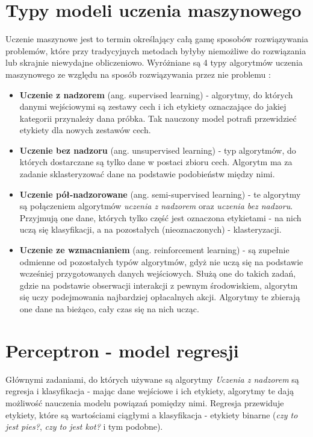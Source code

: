 \documentclass[12pt]{aghdpl}
\begin{document}
		\section{Typy modeli uczenia maszynowego}
		Uczenie maszynowe jest to termin określający całą gamę sposobów rozwiązywania problemów, które przy tradycyjnych metodach byłyby niemożliwe do rozwiązania lub skrajnie niewydajne obliczeniowo. Wyróżniane są 4 typy algorytmów uczenia maszynowego ze względu na sposób rozwiązywania przez nie problemu 	\cite{types_of_machine_learning_algorithms}:
		\begin{itemize}
		\item \textbf{Uczenie z nadzorem} (ang. supervised learning) - algorytmy, do których danymi wejściowymi są zestawy cech i ich etykiety oznaczające do jakiej kategorii przynależy dana próbka. Tak nauczony model potrafi przewidzieć etykiety dla nowych zestawów cech.
		\item \textbf{Uczenie bez nadzoru} (ang. unsupervised learning) - typ algorytmów, do których dostarczane są tylko dane w postaci zbioru cech. Algorytm ma za zadanie sklasteryzować dane na podstawie podobieństw między nimi.
		\item \textbf{Uczenie pół-nadzorowane} (ang. semi-supervised learning) - te algorytmy są połączeniem algorytmów \textit{uczenia z nadzorem} oraz \textit{uczenia bez nadzoru}. Przyjmują one dane, których tylko część jest oznaczona etykietami - na nich uczą się klasyfikacji, a na pozostałych (nieoznaczonych) - klasteryzacji.
		\item \textbf{Uczenie ze wzmacnianiem} (ang. reinforcement learning) - są zupełnie odmienne od pozostałych typów algorytmów, gdyż nie uczą się na podstawie wcześniej przygotowanych danych wejściowych. Służą one do takich zadań, gdzie na podstawie obserwacji interakcji z pewnym środowiskiem, algorytm się uczy podejmowania najbardziej opłacalnych akcji. Algorytmy te zbierają one dane na bieżąco, cały czas się na nich ucząc.
		\end{itemize}
		
		\section{Perceptron - model regresji}
		Głównymi zadaniami, do których używane są algorytmy \textit{Uczenia z nadzorem} są regresja i klasyfikacja - mając dane wejściowe i ich etykiety, algorytmy te dają możliwość nauczenia modelu powiązań pomiędzy nimi. Regresja przewiduje etykiety, które są wartościami ciągłymi a klasyfikacja - etykiety binarne (\textit{czy to jest pies?}, \textit{czy to jest kot?} i tym podobne).
		
\end{document}
